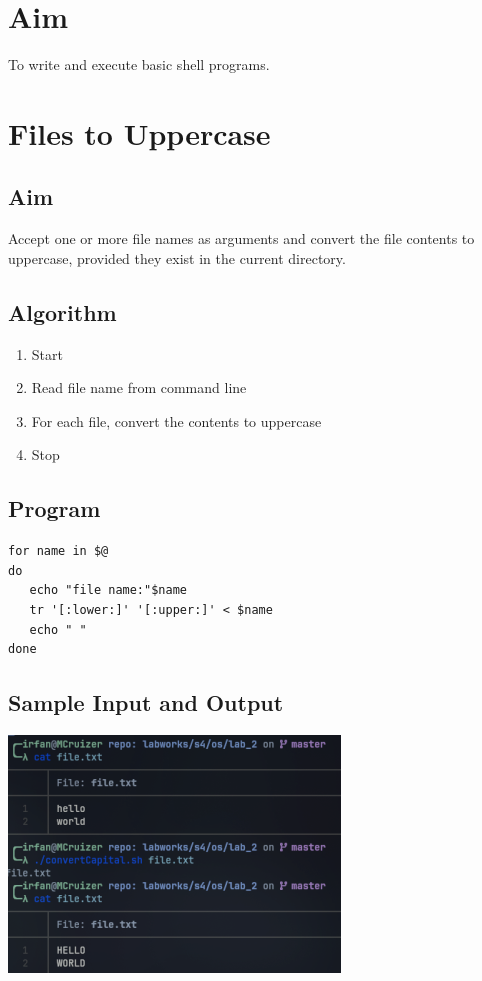 
\section{Aim}
To write and execute basic shell programs.

\section{Files to Uppercase}

\subsection{Aim}
Accept one or more file names as arguments and convert the file contents to uppercase, provided they exist in the current directory.

\subsection{Algorithm}
\begin{enumerate}
   \item Start
   \item Read file name from command line
   \item For each file, convert the contents to uppercase
   \item Stop
\end{enumerate}

\subsection{Program}
\begin{lstlisting}[label={list:program:uppercase}]
for name in $@
do
   echo "file name:"$name
   tr '[:lower:]' '[:upper:]' < $name
   echo " "
done
\end{lstlisting}

\subsection{Sample Input and Output}
 \includegraphics[]{Cycle_1//Outputs/ucase.png}

